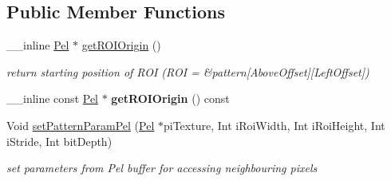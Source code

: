 \subsection*{Public Member Functions}
\begin{DoxyCompactItemize}
\item 
\mbox{\label{class_t_com_pattern_param_a02228f253fa2348e0ec0fc27998df252}} 
\+\_\+\+\_\+inline \hyperlink{_type_def_8h_af92141699657699b4b547be0c8517541}{Pel} $\ast$ \hyperlink{class_t_com_pattern_param_a02228f253fa2348e0ec0fc27998df252}{get\+R\+O\+I\+Origin} ()
\begin{DoxyCompactList}\small\item\em return starting position of R\+OI (R\+OI = \&pattern\mbox{[}Above\+Offset\mbox{]}\mbox{[}Left\+Offset\mbox{]}) \end{DoxyCompactList}\item 
\mbox{\label{class_t_com_pattern_param_affd77b854a6796153374e2e8eb548b37}} 
\+\_\+\+\_\+inline const \hyperlink{_type_def_8h_af92141699657699b4b547be0c8517541}{Pel} $\ast$ {\bfseries get\+R\+O\+I\+Origin} () const
\end{DoxyCompactItemize}
{\bf }\par
\begin{DoxyCompactItemize}
\item 
Void \hyperlink{class_t_com_pattern_param_a0ca8ed93aa14457531834f4d9bcb4bf6}{set\+Pattern\+Param\+Pel} (\hyperlink{_type_def_8h_af92141699657699b4b547be0c8517541}{Pel} $\ast$pi\+Texture, Int i\+Roi\+Width, Int i\+Roi\+Height, Int i\+Stride, Int bit\+Depth)
\begin{DoxyCompactList}\small\item\em set parameters from Pel buffer for accessing neighbouring pixels \end{DoxyCompactList}\end{DoxyCompactItemize}

